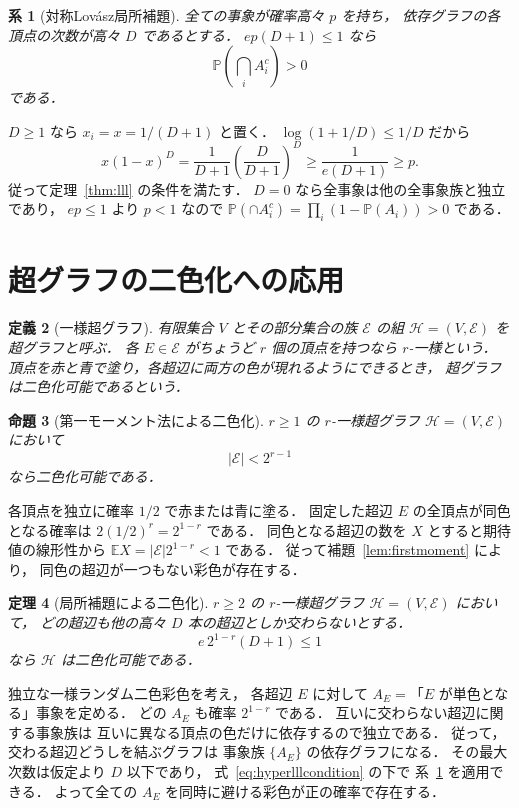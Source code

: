 \documentclass[a5paper,10pt,onecolumn]{jsarticle}
\makeatletter
\theoremstyle{mathnotetheorem}
\newtheorem{theorem}{定理}[section]
\newtheorem{definition}[theorem]{定義}
\newtheorem{proposition}[theorem]{命題}
\newtheorem{corollary}[theorem]{系}
\renewcommand{\proofname}{証明}
\renewenvironment{proof}[1][\proofname]{%
  \par\pushQED{\qed}\normalfont\topsep4\p@\@plus2\p@\relax
  \trivlist\item[\hskip\labelsep\bfseries #1]\ignorespaces
}{\popQED\endtrivlist\@endpefalse}
\makeatother
\begin{document}
\begin{corollary}[対称Lov\'asz局所補題]\label{cor:symmetriclll}
全ての事象が確率高々 $p$ を持ち，
依存グラフの各頂点の次数が高々 $D$ であるとする．
$e p(D+1)\le1$ なら
\[
 \mathbb P\left(\bigcap_i A_i^c\right)>0
\]
である．
\end{corollary}
\begin{proof}
$D\ge1$ なら $x_i=x=1/(D+1)$ と置く．
$\log(1+1/D)\le1/D$ だから
\[
 x(1-x)^D
 =\frac1{D+1}\left(\frac D{D+1}\right)^D
 \ge\frac1{e(D+1)}\ge p.
\]
従って定理~\ref{thm:lll} の条件を満たす．
$D=0$ なら全事象は他の全事象族と独立であり，
$ep\le1$ より $p<1$ なので
$\mathbb P(\cap A_i^c)=\prod_i(1-\mathbb P(A_i))>0$ である．
\end{proof}

\section{超グラフの二色化への応用}
\begin{definition}[一様超グラフ]
有限集合 $V$ とその部分集合の族 $\mathcal E$ の組
$\mathcal H=(V,\mathcal E)$ を超グラフと呼ぶ．
各 $E\in\mathcal E$ がちょうど $r$ 個の頂点を持つなら
$r$-一様という．
頂点を赤と青で塗り，各超辺に両方の色が現れるようにできるとき，
超グラフは\emph{二色化可能}であるという．
\end{definition}

\begin{proposition}[第一モーメント法による二色化]\label{prop:hyperfirst}
$r\ge1$ の $r$-一様超グラフ $\mathcal H=(V,\mathcal E)$ において
\[
 |\mathcal E|<2^{r-1}
\]
なら二色化可能である．
\end{proposition}
\begin{proof}
各頂点を独立に確率 $1/2$ で赤または青に塗る．
固定した超辺 $E$ の全頂点が同色となる確率は
$2(1/2)^r=2^{1-r}$ である．
同色となる超辺の数を $X$ とすると期待値の線形性から
$\mathbb EX=|\mathcal E|2^{1-r}<1$ である．
従って補題~\ref{lem:firstmoment} により，
同色の超辺が一つもない彩色が存在する．
\end{proof}

\begin{theorem}[局所補題による二色化]\label{thm:hyperlll}
$r\ge2$ の $r$-一様超グラフ $\mathcal H=(V,\mathcal E)$ において，
どの超辺も他の高々 $D$ 本の超辺としか交わらないとする．
\begin{equation}\label{eq:hyperlllcondition}
 e\,2^{1-r}(D+1)\le1
\end{equation}
なら $\mathcal H$ は二色化可能である．
\end{theorem}
\begin{proof}
独立な一様ランダム二色彩色を考え，
各超辺 $E$ に対して $A_E=$「$E$ が単色となる」事象を定める．
どの $A_E$ も確率 $2^{1-r}$ である．
互いに交わらない超辺に関する事象族は
互いに異なる頂点の色だけに依存するので独立である．
従って，交わる超辺どうしを結ぶグラフは
事象族 $\{A_E\}$ の依存グラフになる．
その最大次数は仮定より $D$ 以下であり，
式~\eqref{eq:hyperlllcondition} の下で
系~\ref{cor:symmetriclll} を適用できる．
よって全ての $A_E$ を同時に避ける彩色が正の確率で存在する．
\end{proof}
\end{document}
